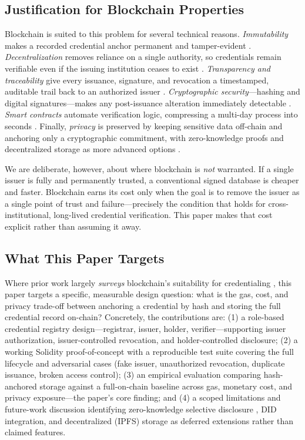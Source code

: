 \documentclass[conference]{IEEEtran}
\begin{document}
\subsection{Justification for Blockchain Properties}
Blockchain is suited to this problem for several technical reasons. \emph{Immutability} makes a recorded credential anchor permanent and tamper-evident \cite{cheng_smartcontract,capece_trust}. \emph{Decentralization} removes reliance on a single authority, so credentials remain verifiable even if the issuing institution ceases to exist \cite{slr_certificate,rustemi_diar}. \emph{Transparency and traceability} give every issuance, signature, and revocation a timestamped, auditable trail back to an authorized issuer \cite{cardenas_prototype,capece_trust}. \emph{Cryptographic security}---hashing and digital signatures---makes any post-issuance alteration immediately detectable \cite{alhemairy_uae}. \emph{Smart contracts} automate verification logic, compressing a multi-day process into seconds \cite{slr_certificate}. Finally, \emph{privacy} is preserved by keeping sensitive data off-chain and anchoring only a cryptographic commitment, with zero-knowledge proofs and decentralized storage as more advanced options \cite{berrios_zkbar}.

We are deliberate, however, about where blockchain is \emph{not} warranted. If a single issuer is fully and permanently trusted, a conventional signed database is cheaper and faster. Blockchain earns its cost only when the goal is to remove the issuer as a single point of trust and failure---precisely the condition that holds for cross-institutional, long-lived credential verification. This paper makes that cost explicit rather than assuming it away.

\subsection{What This Paper Targets}
Where prior work largely \emph{surveys} blockchain's suitability for credentialing \cite{slr_certificate}, this paper targets a specific, measurable design question: what is the gas, cost, and privacy trade-off between anchoring a credential by hash and storing the full credential record on-chain? Concretely, the contributions are: (1) a role-based credential registry design---registrar, issuer, holder, verifier---supporting issuer authorization, issuer-controlled revocation, and holder-controlled disclosure; (2) a working Solidity proof-of-concept with a reproducible test suite covering the full lifecycle and adversarial cases (fake issuer, unauthorized revocation, duplicate issuance, broken access control); (3) an empirical evaluation comparing hash-anchored storage against a full-on-chain baseline across gas, monetary cost, and privacy exposure---the paper's core finding; and (4) a scoped limitations and future-work discussion identifying zero-knowledge selective disclosure \cite{berrios_zkbar}, DID integration, and decentralized (IPFS) storage as deferred extensions rather than claimed features.
\end{document}
